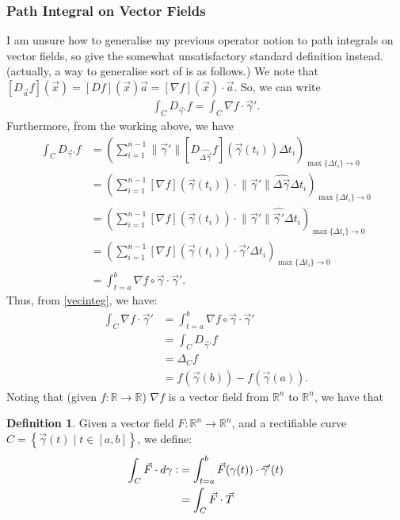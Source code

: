 \documentclass{article}
\theoremstyle{definition}
\newtheorem{defn}{Definition}[subsubsection]
\begin{document}
\subsubsection{Path Integral on Vector Fields}
I am unsure how to generalise my previous operator notion to path integrals on vector fields, so give the somewhat unsatisfactory standard definition instead.
(actually, a way to generalise sort of is as follows.)
We note that $[D_{\vec a}f](\vec x)=[Df](\vec x)\vec a=[\nabla f](\vec x)\cdot\vec a$. So, we can write
\begin{align}
	\int_CD_{\vec\gamma'}f=\int_C\nabla f\cdot\vec\gamma'.\label{vecinteg}
\end{align}
Furthermore, from the working above, we have
\begin{align*}
	\int_CD_{\vec\gamma'}f&=\left(\sum_{i=1}^{n-1}\lVert \vec\gamma'\rVert\left[D_{\hat{\Delta\vec\gamma}}f\right]\left(\vec\gamma (t_i)\right)\Delta t_i\right)_{\max\{\Delta t_i\}\rightarrow0}\\
	&=\left(\sum_{i=1}^{n-1}\left[\nabla f\right]\left(\vec\gamma (t_i)\right)\cdot\lVert \vec\gamma'\rVert\hat{\Delta\vec\gamma}\Delta t_i\right)_{\max\{\Delta t_i\}\rightarrow0}\\
	&=\left(\sum_{i=1}^{n-1}\left[\nabla f\right]\left(\vec\gamma (t_i)\right)\cdot\lVert \vec\gamma'\rVert\hat{\vec\gamma'}\Delta t_i\right)_{\max\{\Delta t_i\}\rightarrow0}\\
	&=\left(\sum_{i=1}^{n-1}\left[\nabla f\right]\left(\vec\gamma (t_i)\right)\cdot\vec\gamma'\Delta t_i\right)_{\max\{\Delta t_i\}\rightarrow0}\\
	&=\int_{t=a}^b\nabla f\circ\vec\gamma \cdot\vec\gamma'.
\end{align*}
Thus, from \eqref{vecinteg}, we have:
\begin{align*}
	\int_C\nabla f\cdot\vec\gamma'&=\int_{t=a}^b\nabla f\circ\vec\gamma \cdot\vec\gamma'\\
	&=\int_CD_{\vec\gamma'}f\\
	&=\Delta_Cf\\
	&=f(\vec\gamma(b))-f(\vec\gamma(a)).
\end{align*}
Noting that (given $f:\mathbb{R}\rightarrow \mathbb{R}$) $\nabla f$ is a vector field from $\mathbb{R}^n$ to $\mathbb{R}^n$, we have that 
\begin{defn}
	Given a vector field $F:\mathbb{R}^n\rightarrow \mathbb{R}^n$, and a rectifiable curve $C=\left\{\vec\gamma(t)\mid t\in[a,b]\right\}$, we define:
	\begin{align*}
		\int_C\vec F\cdot d\gamma\vcentcolon&=\int_{t=a}^b\vec F(\gamma(t))\cdot\vec \gamma'(t)\\
		&=\int_C\vec F\cdot\vec T
	\end{align*}
\end{defn}
\end{document}
